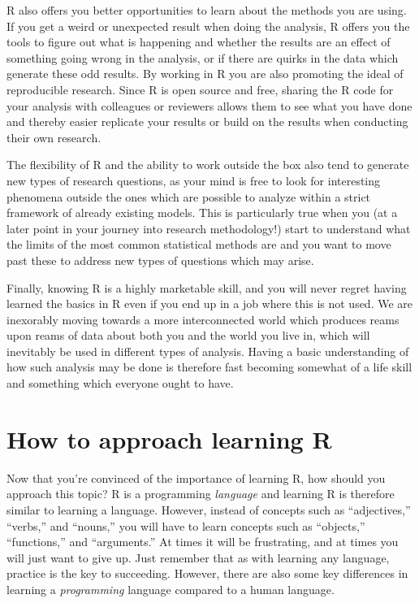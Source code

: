 \documentclass[
]{book}
\begin{document}
R also offers you better opportunities to learn about the methods you are using. If you get a weird or unexpected result when doing the analysis, R offers you the tools to figure out what is happening and whether the results are an effect of something going wrong in the analysis, or if there are quirks in the data which generate these odd results. By working in R you are also promoting the ideal of reproducible research. Since R is open source and free, sharing the R code for your analysis with colleagues or reviewers allows them to see what you have done and thereby easier replicate your results or build on the results when conducting their own research.

The flexibility of R and the ability to work outside the box also tend to generate new types of research questions, as your mind is free to look for interesting phenomena outside the ones which are possible to analyze within a strict framework of already existing models. This is particularly true when you (at a later point in your journey into research methodology!) start to understand what the limits of the most common statistical methods are and you want to move past these to address new types of questions which may arise.

Finally, knowing R is a highly marketable skill, and you will never regret having learned the basics in R even if you end up in a job where this is not used. We are inexorably moving towards a more interconnected world which produces reams upon reams of data about both you and the world you live in, which will inevitably be used in different types of analysis. Having a basic understanding of how such analysis may be done is therefore fast becoming somewhat of a life skill and something which everyone ought to have.

\hypertarget{how-to-approach-learning-r}{%
\section{How to approach learning R}\label{how-to-approach-learning-r}}

Now that you're convinced of the importance of learning R, how should you approach this topic? R is a programming \emph{language} and learning R is therefore similar to learning a language. However, instead of concepts such as ``adjectives,'' ``verbs,'' and ``nouns,'' you will have to learn concepts such as ``objects,'' ``functions,'' and ``arguments.'' At times it will be frustrating, and at times you will just want to give up. Just remember that as with learning any language, practice is the key to succeeding. However, there are also some key differences in learning a \emph{programming} language compared to a human language.
\end{document}

